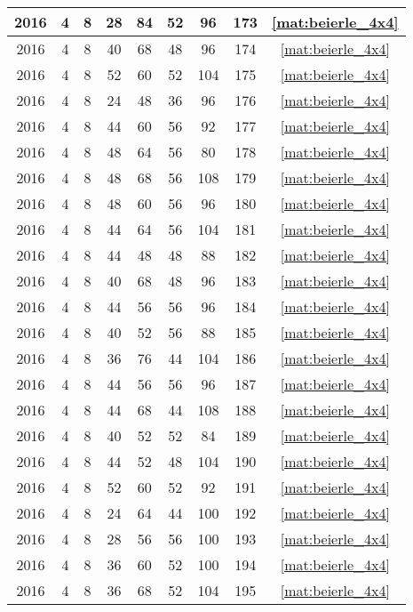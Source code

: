 \begin{longtable}{|c|c|c|c|c|c|c|c|c|}
2016 & 4 & 8 & 28 & 84 & 52 & 96 & 173 & \eqref{mat:beierle_4x4} \\ \hline 
2016 & 4 & 8 & 40 & 68 & 48 & 96 & 174 & \eqref{mat:beierle_4x4} \\ \hline 
2016 & 4 & 8 & 52 & 60 & 52 & 104 & 175 & \eqref{mat:beierle_4x4} \\ \hline 
2016 & 4 & 8 & 24 & 48 & 36 & 96 & 176 & \eqref{mat:beierle_4x4} \\ \hline 
2016 & 4 & 8 & 44 & 60 & 56 & 92 & 177 & \eqref{mat:beierle_4x4} \\ \hline 
2016 & 4 & 8 & 48 & 64 & 56 & 80 & 178 & \eqref{mat:beierle_4x4} \\ \hline 
2016 & 4 & 8 & 48 & 68 & 56 & 108 & 179 & \eqref{mat:beierle_4x4} \\ \hline 
2016 & 4 & 8 & 48 & 60 & 56 & 96 & 180 & \eqref{mat:beierle_4x4} \\ \hline 
2016 & 4 & 8 & 44 & 64 & 56 & 104 & 181 & \eqref{mat:beierle_4x4} \\ \hline 
2016 & 4 & 8 & 44 & 48 & 48 & 88 & 182 & \eqref{mat:beierle_4x4} \\ \hline 
2016 & 4 & 8 & 40 & 68 & 48 & 96 & 183 & \eqref{mat:beierle_4x4} \\ \hline 
2016 & 4 & 8 & 44 & 56 & 56 & 96 & 184 & \eqref{mat:beierle_4x4} \\ \hline 
2016 & 4 & 8 & 40 & 52 & 56 & 88 & 185 & \eqref{mat:beierle_4x4} \\ \hline 
2016 & 4 & 8 & 36 & 76 & 44 & 104 & 186 & \eqref{mat:beierle_4x4} \\ \hline 
2016 & 4 & 8 & 44 & 56 & 56 & 96 & 187 & \eqref{mat:beierle_4x4} \\ \hline 
2016 & 4 & 8 & 44 & 68 & 44 & 108 & 188 & \eqref{mat:beierle_4x4} \\ \hline 
2016 & 4 & 8 & 40 & 52 & 52 & 84 & 189 & \eqref{mat:beierle_4x4} \\ \hline 
2016 & 4 & 8 & 44 & 52 & 48 & 104 & 190 & \eqref{mat:beierle_4x4} \\ \hline 
2016 & 4 & 8 & 52 & 60 & 52 & 92 & 191 & \eqref{mat:beierle_4x4} \\ \hline 
2016 & 4 & 8 & 24 & 64 & 44 & 100 & 192 & \eqref{mat:beierle_4x4} \\ \hline 
2016 & 4 & 8 & 28 & 56 & 56 & 100 & 193 & \eqref{mat:beierle_4x4} \\ \hline 
2016 & 4 & 8 & 36 & 60 & 52 & 100 & 194 & \eqref{mat:beierle_4x4} \\ \hline 
2016 & 4 & 8 & 36 & 68 & 52 & 104 & 195 & \eqref{mat:beierle_4x4} \\ \hline 

\end{longtable}
